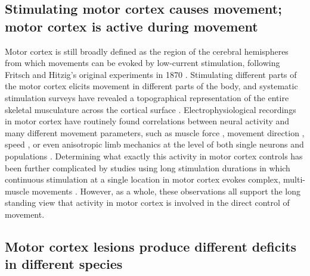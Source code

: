 \subsection{Stimulating motor cortex causes movement; motor cortex is active during movement}

Motor cortex is still broadly defined as the region of the cerebral hemispheres from which movements can be evoked by low-current stimulation, following Fritsch and Hitzig's original experiments in 1870 \citep{Fritsch1870}. Stimulating different parts of the motor cortex elicits movement in different parts of the body, and systematic stimulation surveys have revealed a topographical representation of the entire skeletal musculature across the cortical surface \citep{Leyton1917, Penfield1937, Neafsey1986}. Electrophysiological recordings in motor cortex have routinely found correlations between neural activity and many different movement parameters, such as muscle force \citep{Evarts1968}, movement direction \citep{Georgopoulos1986}, speed \citep{Schwartz1993}, or even anisotropic limb mechanics \citep{Scott2001} at the level of both single neurons \citep{Evarts1968,Churchland2007} and populations \citep{Georgopoulos1986,Churchland2012}. Determining what exactly this activity in motor cortex controls \citep{Todorov2000} has been further complicated by studies using long stimulation durations in which continuous stimulation at a single location in motor cortex evokes complex, multi-muscle movements \citep{Graziano2002,Aflalo2006}. However, as a whole, these observations all support the long standing view that activity in motor cortex is involved in the direct control of movement.

\subsection{Motor cortex lesions produce different deficits in different species}

